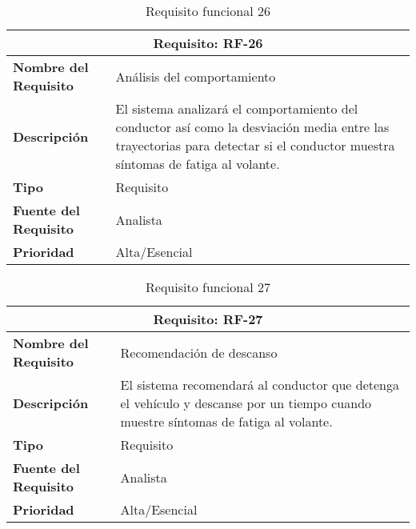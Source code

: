 \begin{table}[H]
\begin{center}
\begin{tabular}{p{} p{7cm}}
\multicolumn{2}{c}{\textbf{Requisito: RF-26} } \\
\hline \hline
\textbf{Nombre del Requisito} & Análisis del comportamiento\\
\hline
\textbf{Descripción} & El sistema analizará el comportamiento del conductor así como la desviación media entre las trayectorias para detectar si el conductor muestra síntomas de fatiga al volante.\\
\hline
\textbf{Tipo} & Requisito  \\
\hline
\textbf{Fuente del Requisito} & Analista  \\
\hline
\textbf{Prioridad} & Alta/Esencial  \\ \hline
\end{tabular}
\caption{Requisito funcional 26}
\label{tab:RF-26}
\end{center}
\end{table}

\begin{table}[H]
\begin{center}
\begin{tabular}{p{} p{7cm}}
\multicolumn{2}{c}{\textbf{Requisito: RF-27} } \\
\hline \hline
\textbf{Nombre del Requisito} & Recomendación de descanso\\
\hline
\textbf{Descripción} & El sistema recomendará al conductor que detenga el vehículo y descanse por un tiempo cuando muestre síntomas de fatiga al volante. \\
\hline
\textbf{Tipo} & Requisito  \\
\hline
\textbf{Fuente del Requisito} & Analista  \\
\hline
\textbf{Prioridad} & Alta/Esencial  \\ \hline
\end{tabular}
\caption{Requisito funcional 27}
\label{tab:RF-27}
\end{center}
\end{table}

